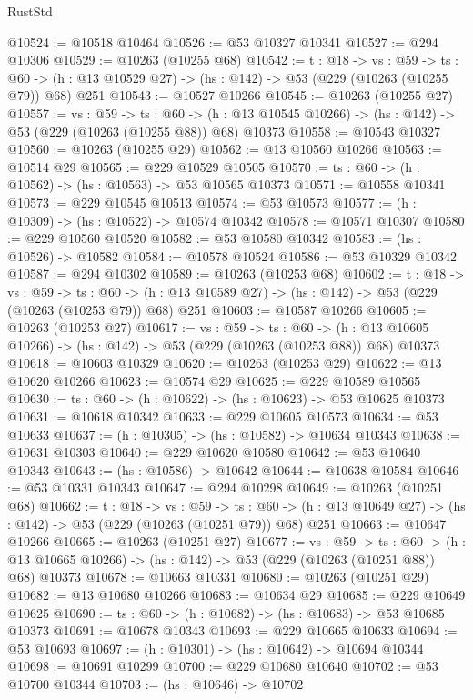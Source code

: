 \begin{lexlean}{RustStd}
\begin{coremodule}
@10524 := @10518 @10464
@10526 := @53 @10327 @10341
@10527 := @294 @10306
@10529 := @10263 (@10255 @68)
@10542 := {t : @18} ->
  {vs : @59} ->
  {ts : @60} -> (h : @13 @10529 @27) -> (hs : @142) -> @53 (@229 (@10263 (@10255 @79)) @68) @251
@10543 := @10527 @10266
@10545 := @10263 (@10255 @27)
@10557 := {vs : @59} ->
  {ts : @60} ->
  (h : @13 @10545 @10266) -> (hs : @142) -> @53 (@229 (@10263 (@10255 @88)) @68) @10373
@10558 := @10543 @10327
@10560 := @10263 (@10255 @29)
@10562 := @13 @10560 @10266
@10563 := @10514 @29
@10565 := @229 @10529 @10505
@10570 := {ts : @60} -> (h : @10562) -> (hs : @10563) -> @53 @10565 @10373
@10571 := @10558 @10341
@10573 := @229 @10545 @10513
@10574 := @53 @10573
@10577 := (h : @10309) -> (hs : @10522) -> @10574 @10342
@10578 := @10571 @10307
@10580 := @229 @10560 @10520
@10582 := @53 @10580 @10342
@10583 := (hs : @10526) -> @10582
@10584 := @10578 @10524
@10586 := @53 @10329 @10342
@10587 := @294 @10302
@10589 := @10263 (@10253 @68)
@10602 := {t : @18} ->
  {vs : @59} ->
  {ts : @60} -> (h : @13 @10589 @27) -> (hs : @142) -> @53 (@229 (@10263 (@10253 @79)) @68) @251
@10603 := @10587 @10266
@10605 := @10263 (@10253 @27)
@10617 := {vs : @59} ->
  {ts : @60} ->
  (h : @13 @10605 @10266) -> (hs : @142) -> @53 (@229 (@10263 (@10253 @88)) @68) @10373
@10618 := @10603 @10329
@10620 := @10263 (@10253 @29)
@10622 := @13 @10620 @10266
@10623 := @10574 @29
@10625 := @229 @10589 @10565
@10630 := {ts : @60} -> (h : @10622) -> (hs : @10623) -> @53 @10625 @10373
@10631 := @10618 @10342
@10633 := @229 @10605 @10573
@10634 := @53 @10633
@10637 := (h : @10305) -> (hs : @10582) -> @10634 @10343
@10638 := @10631 @10303
@10640 := @229 @10620 @10580
@10642 := @53 @10640 @10343
@10643 := (hs : @10586) -> @10642
@10644 := @10638 @10584
@10646 := @53 @10331 @10343
@10647 := @294 @10298
@10649 := @10263 (@10251 @68)
@10662 := {t : @18} ->
  {vs : @59} ->
  {ts : @60} -> (h : @13 @10649 @27) -> (hs : @142) -> @53 (@229 (@10263 (@10251 @79)) @68) @251
@10663 := @10647 @10266
@10665 := @10263 (@10251 @27)
@10677 := {vs : @59} ->
  {ts : @60} ->
  (h : @13 @10665 @10266) -> (hs : @142) -> @53 (@229 (@10263 (@10251 @88)) @68) @10373
@10678 := @10663 @10331
@10680 := @10263 (@10251 @29)
@10682 := @13 @10680 @10266
@10683 := @10634 @29
@10685 := @229 @10649 @10625
@10690 := {ts : @60} -> (h : @10682) -> (hs : @10683) -> @53 @10685 @10373
@10691 := @10678 @10343
@10693 := @229 @10665 @10633
@10694 := @53 @10693
@10697 := (h : @10301) -> (hs : @10642) -> @10694 @10344
@10698 := @10691 @10299
@10700 := @229 @10680 @10640
@10702 := @53 @10700 @10344
@10703 := (hs : @10646) -> @10702

\end{coremodule}
\end{lexlean}
